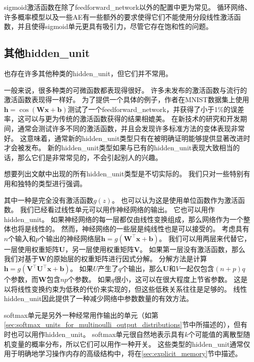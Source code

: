 
\gls{sigmoid}激活函数在除了\gls{feedforward_network}以外的配置中更为常见。
循环网络、许多概率模型以及一些\gls{AE}有一些额外的要求使得它们不能使用分段线性激活函数，并且使得\gls{sigmoid}单元更具有吸引力，尽管它存在饱和性的问题。

\subsection{其他\gls{hidden_unit}}
\label{sec:other_hidden_units}

也存在许多其他种类的\gls{hidden_unit}，但它们并不常用。

一般来说，很多种类的可微函数都表现得很好。
许多未发布的激活函数与流行的激活函数表现得一样好。
为了提供一个具体的例子，作者在MNIST数据集上使用$\bm{h}=\cos(\bm{W}\bm{x}+\bm{b})$测试了一个\gls{feedforward_network}，并获得了小于1\%的误差率，这可以与更为传统的激活函数获得的结果相媲美。
在新技术的研究和开发期间，通常会测试许多不同的激活函数，并且会发现许多标准方法的变体表现非常好。
这意味着，通常新的\gls{hidden_unit}类型只有在被明确证明能够提供显著改进时才会被发布。
新的\gls{hidden_unit}类型如果与已有的\gls{hidden_unit}表现大致相当的话，那么它们是非常常见的，不会引起别人的兴趣。

想要列出文献中出现的所有\gls{hidden_unit}类型是不切实际的。
我们只对一些特别有用和独特的类型进行强调。

其中一种是完全没有激活函数$g(z)$。
也可以认为这是使用单位函数作为激活函数。
我们已经看过线性单元可以用作神经网络的输出。
它也可以用作\gls{hidden_unit}。
如果神经网络的每一层都仅由线性变换组成，那么网络作为一个整体也将是线性的。
然而，神经网络的一些层是纯线性也是可以接受的。
考虑具有$n$个输入和$p$个输出的神经网络层$\bm{h}=g(\bm{W}^\top \bm{x}+\bm{b})$。
我们可以用两层来代替它，一层使用权重矩阵$\bm{U}$，另一层使用权重矩阵$\bm{V}$。
如果第一层没有激活函数，那么我们对基于$\bm{W}$的原始层的权重矩阵进行因式分解。
分解方法是计算$\bm{h}=g(\bm{V}^\top \bm{U}^\top \bm{x}+\bm{b})$。
如果$U$产生了$q$个输出，那么$\bm{U}$和$V$一起仅包含$(n+p)q$个参数，而$\bm{W}$包含$np$个参数。
如果$q$很小，这可以在很大程度上节省参数。
这是以将线性变换约束为低秩的代价来实现的，但这些低秩关系往往是足够的。
线性\gls{hidden_unit}因此提供了一种减少网络中参数数量的有效方法。



softmax单元是另外一种经常用作输出的单元（如第\ref{sec:softmax_units_for_multinoulli_output_distributions}节中所描述的），但有时也可以用作\gls{hidden_unit}。
softmax单元很自然地表示具有$k$个可能值的离散型随机变量的概率分布，所以它们可以用作一种开关。
这些类型的\gls{hidden_unit}通常仅用于明确地学习操作内存的高级结构中，将在\ref{sec:explicit_memory}节中描述。

